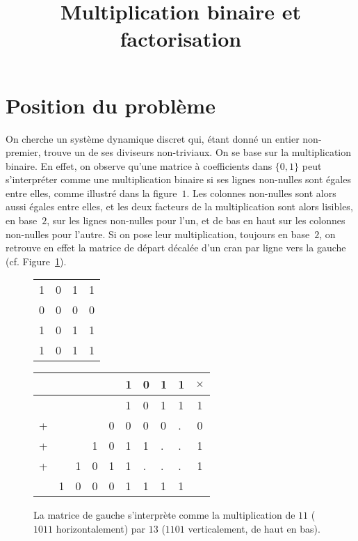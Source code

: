 \documentclass[11pt, openany, a4paper]{article}
\begin{document}
\renewcommand{\labelitemi}{$\bullet$}

\title{Multiplication binaire et factorisation}
\date{}
\author{}
\maketitle



\section*{Position du problème}


On cherche un système dynamique discret qui, étant donné un entier non-premier, trouve un de ses diviseurs non-triviaux. On se base sur la multiplication binaire. En effet, on observe qu'une matrice à coefficients dans $\{0,1\}$ peut s'interpréter comme une multiplication binaire si ses lignes non-nulles sont égales entre elles, comme illustré dans la figure~$1$. Les colonnes non-nulles sont alors aussi égales entre elles, et les deux facteurs de la multiplication sont alors lisibles, en base~$2$, sur les lignes non-nulles pour l'un, et de bas en haut sur les colonnes non-nulles pour l'autre. Si on pose leur multiplication, toujours en base~$2$, on retrouve en effet la matrice de départ décalée d'un cran par ligne vers la gauche (cf. Figure~\ref{fig:ExShift}).




\begin{figure}[h]
\centering
\begin{minipage}[]{0.25\linewidth}

\begin{tabular}{cccc}
1&0&1&1\\
0&0&0&0\\
1&0&1&1\\
1&0&1&1\\
\end{tabular}

\end{minipage}
\quad
\begin{minipage}[]{0.4\linewidth}


\begin{tabular}{lllllllll|c}
&&&&&1&0&1&1&$\times$\\
\hline
&&&&&1&0&1&1&1\\
+&&&&0&0&0&0&.&0 \\
+&&&1&0&1&1&.&.&1\\
+&&1&0&1&1&.&.&.&1\\
\hline
&1&0&0&0&1&1&1&1&\\
\end{tabular}
\end{minipage}
\caption{La matrice de gauche s'interprète comme la multiplication de $11$ ($1011$ horizontalement) par $13$ ($1101$ verticalement, de haut en bas).}
\label{fig:ExShift}
\end{figure}
\end{document}
